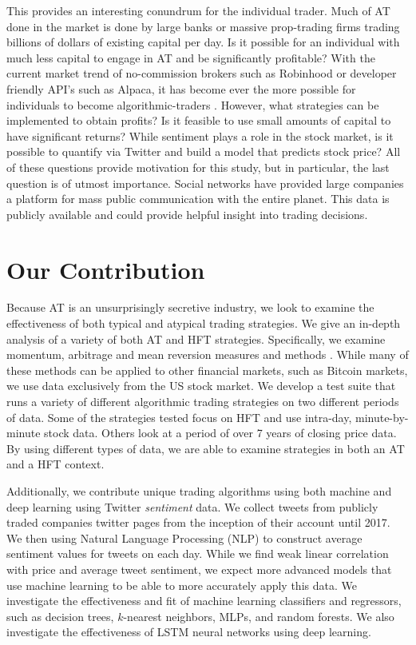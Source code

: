 \documentclass[../thesis.tex]{subfiles}
\begin{document}
This provides an interesting conundrum for the individual trader. Much of AT done in the market is done by large banks or massive prop-trading firms trading billions of dollars of existing capital per day. Is it possible for an individual with much less capital to engage in AT and be significantly profitable? With the current market trend of no-commission brokers such as Robinhood or developer friendly API's such as Alpaca, it has become ever the more possible for individuals to become algorithmic-traders \cite{Alpaca}. However, what strategies can be implemented to obtain profits? Is it feasible to use small amounts of capital to have significant returns? While sentiment plays a role in the stock market, is it possible to quantify via Twitter and build a model that predicts stock price? All of these questions provide motivation for this study, but in particular, the last question is of utmost importance. Social networks have provided large companies a platform for mass public communication with the entire planet. This data is publicly available and could provide helpful insight into trading decisions. 


\section{Our Contribution}
Because AT is an unsurprisingly secretive industry, we look to examine the effectiveness of both typical and atypical trading strategies. We give an in-depth analysis of a variety of both AT and HFT strategies. Specifically, we examine momentum, arbitrage and mean reversion measures and methods \cite{Aldridge2010}. While many of these methods can be applied to other financial markets, such as Bitcoin markets, we use data exclusively from the US stock market. We develop a test suite that runs a variety of different algorithmic trading strategies on two different periods of data. Some of the strategies tested focus on HFT and use intra-day, minute-by-minute stock data. Others look at a period of over 7 years of closing price data. By using different types of data, we are able to examine strategies in both an AT and a HFT context. 

Additionally, we contribute unique trading algorithms using both machine and deep learning using Twitter \textit{sentiment} data. We collect tweets from publicly traded companies twitter pages from the inception of their account until 2017. We then using Natural Language Processing (NLP) to construct average sentiment values for tweets on each day. While we find weak linear correlation with price and average tweet sentiment, we expect more advanced models that use machine learning to be able to more accurately apply this data. We investigate the effectiveness and fit of machine learning classifiers and regressors, such as decision trees, $k$-nearest neighbors, MLPs, and random forests. We also investigate the effectiveness of LSTM neural networks using deep learning. 
\end{document}
